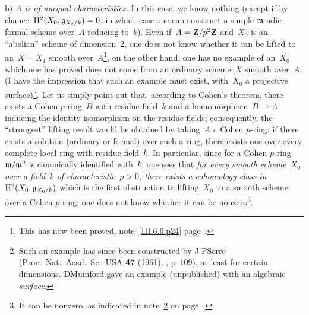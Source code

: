 b) \emph{$A$ is of unequal characteristics.} In this case, we
know nothing (except if by chance~$\mathrm{H}^2(X_0,\mathfrak{g}_{X_0/k})=0$,
in which case one can construct a simple $\mathfrak{m}$-adic formal
scheme over~$A$ reducing to~$k$). Even if~$A=\mathbf{Z}/p^2\mathbf{Z}$ and~$X_0$
is an ``abelian'' scheme of dimension~$2$, one does not know whether
it can be lifted to an~$X=X_1$ smooth over~$A$\footnote{This has
now been proved, \cf note~\ref{III.6.6.p24} page~\pageref{III.6.6.p24}.},
on the other hand, one has no example of an~$X_0$ which one has
proved does not come from an ordinary scheme~$X$ smooth over~$A$.
(I have the impression that such an example must exist, with~$X_0$
a projective surface)\footnote{\label{nIII.3}Such an example has since been
constructed by
J-P\ptbl Serre (Proc.\ Nat.\ Acad.\ Sc.\ USA \textbf{47} (1961),
, p--109), at least for certain
dimensions. D\ptbl Mumford gave an example (unpublished) with
an algebraic \emph{surface}.}. Let us simply point out that,
according to Cohen's theorem, there exists a Cohen $p$-ring~$B$
with residue field~$k$ and a homomorphism~$B\to A$ inducing the
identity isomorphism on the residue fields; consequently, the
``strongest'' lifting result would be obtained by taking~$A$
%
%
a Cohen $p$-ring: if there exists a solution (ordinary or formal)
over such a ring, there exists one over every complete local ring
with residue field~$k$. In particular, since for a Cohen $p$-ring
$\mathfrak{m}/\mathfrak{m}^2$ is canonically identified with~$k$, one sees
that \emph{for every smooth scheme~$X_0$ over a field~$k$ of
characteristic~$p>0$, there exists a cohomology class
in~$\mathrm{H}^2(X_0,\mathfrak{g}_{X_0/k})$} which is the first obstruction to
lifting~$X_0$ to a smooth scheme over a Cohen $p$-ring; one does
not know whether it can be nonzero\footnote{It can be nonzero,
as indicated in note~\ref{nIII.3} on page~\pageref{nIII.3}.}.

